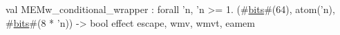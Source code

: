 val MEMw_conditional_wrapper : forall 'n, 'n >= 1. (#\hyperref[zbits]{bits}#(64), atom('n), #\hyperref[zbits]{bits}#(8 * 'n)) -> bool effect {escape, wmv, wmvt, eamem}
